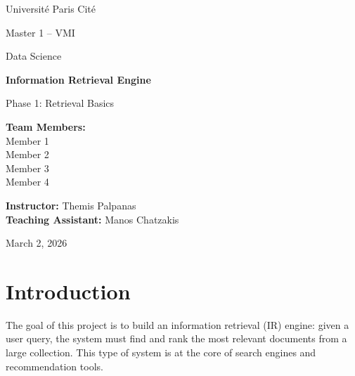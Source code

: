 \documentclass[12pt,a4paper]{article}
\begin{document}
\begin{titlepage}
    \centering
    \vspace*{2cm}

    {\Large Universit\'e Paris Cit\'e \par}
    {\large Master 1 -- VMI \par}
    {\large Data Science \par}

    \vspace{2.5cm}

    {\Huge \textbf{Information Retrieval Engine} \par}
    \vspace{0.5cm}
    {\LARGE Phase 1: Retrieval Basics \par}

    \vspace{2cm}

    {\large
    \textbf{Team Members:} \\[0.4cm]
    Member 1 \\
    Member 2 \\
    Member 3 \\
    Member 4 \\
    }

    \vfill

    {\large
    \textbf{Instructor:} Themis Palpanas \\
    \textbf{Teaching Assistant:} Manos Chatzakis \\
    }

    \vspace{1cm}

    {\large March 2, 2026 \par}
\end{titlepage}

\tableofcontents
\newpage

\section{Introduction}

The goal of this project is to build an information retrieval (IR) engine: given a user query, the system must find and rank the most relevant documents from a large collection. This type of system is at the core of search engines and recommendation tools.
\end{document}
